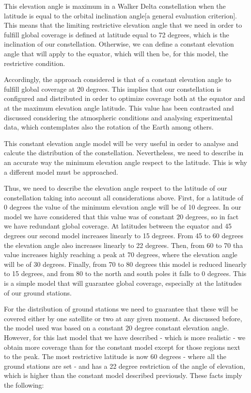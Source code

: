 This elevation angle is maximum in a Walker Delta constellation when the latitude is equal to the orbital inclination angle[a general evaluation criterion]. This means that the limiting restrictive elevation angle that we need in order to fulfill global coverage is defined at latitude equal to 72 degrees, which is the inclination of our constellation. Otherwise, we can define a constant elevation angle that will apply to the equator, which will then be, for this model, the restrictive condition.

Accordingly, the approach considered is that of a constant elevation angle to fulfill global coverage at 20 degrees. This implies that our constellation is configured and distributed in order to optimize coverage both at the equator and at the maximum elevation angle latitude. This value has been contrasted and discussed considering the atmospheric conditions and analysing experimental data, which contemplates also the rotation of the Earth among others.

This constant elevation angle model will be very useful in order to analyse and calcute the distribution of the constellation. Nevertheless, we need to describe in an accurate way the minimum elevation angle respect to the latitude. This is why a different model must be approached.

Thus, we need to describe the elevation angle respect to the latitude of our constellation taking into account all considerations above. First, for a latitude of 0 degrees the value of the minimum elevation angle will be of 10 degrees. In our model we have considered that this value was of constant 20 degrees, so in fact we have redundant global coverage. At latitudes between the equator and 45 degrees our second model increases linearly to 15 degrees. From 45 to 60 degrees the elevation angle also increases linearly to 22 degrees. Then, from 60 to 70 tha value increases highly reaching a peak at 70 degrees, where the elevation angle will be of 30 degrees. Finally, from 70 to 80 degrees this model is reduced linearly to 15 degrees, and from 80 to the north and south poles it falls to 0 degrees. This is a simple model that will guarantee global coverage, especially at the latitudes of our ground stations.

For the distribution of ground stations we need to guarantee that these will be covered either by one satellite or two at any given moment. As discussed before, the model used was based on a constant 20 degree constant elevation angle. However, for this last model that we have described - which is more realistic - we obtain more coverage than for the constant model except for those regions next to the peak. The most restrictive latitude is now 60 degrees - where all the ground stations are set - and has a 22 degree restriction of the angle of elevation, which is higher than the constant model described previously. These facts imply the following:

